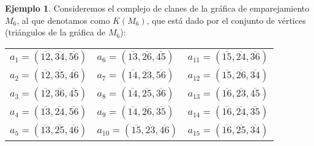 \documentclass[12pt]{book}
\theoremstyle{definition}
\newtheorem{example}[theorem]{Ejemplo}
\newcounter{in}
\begin{document}
\begin{example}
  \label{ejemploKM6}
  Consideremos el complejo de clanes de la gráfica de emparejamiento
  $M_{6}$, al que denotamos como $K(M_{6})$, que está dado por el
  conjunto de vértices (triángulos de la gráfica de
  $M_{6}$):

\begin{center}
  \begin{tabular}[h]{lll}
    $a_{1}=(\overline{12},\overline{34},\overline{56})$&$a_{6}=(\overline{13},\overline{26},\overline{45})$&$a_{11}=(\overline{15},\overline{24},\overline{36})$  \\
    $a_{2}=(\overline{12},\overline{35},\overline{46})$&$a_{7}=(\overline{14},\overline{23},\overline{56})$&$a_{12}=(\overline{15},\overline{26},\overline{34})$  \\
    $a_{3}=(\overline{12},\overline{36},\overline{45})$&$a_{8}=(\overline{14},\overline{25},\overline{36})$&$a_{13}=(\overline{16},\overline{23},\overline{45})$  \\
    $a_{4}=(\overline{13},\overline{24},\overline{56})$&$a_{9}=(\overline{14},\overline{26},\overline{35})$&$a_{14}=(\overline{16},\overline{24},\overline{35})$ \\
    $a_{5}=(\overline{13},\overline{25},\overline{46})$&$a_{10}=(\overline{15},\overline{23},\overline{46})$&$a_{15}=(\overline{16},\overline{25},\overline{34})$  
  \end{tabular}
\end{center}


\end{example}
\end{document}
